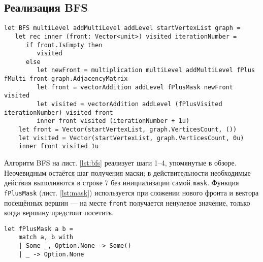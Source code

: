 \subsection{Реализация BFS}

\begin{lstlisting}[style=fsharp, caption={Функция, реализующая обход в ширину с применением матрично-векторных операций}, label={lst:bfs},  frame=single]
let BFS multiLevel addMultiLevel addLevel startVertexList graph =
   let rec inner (front: Vector<unit>) visited iterationNumber =
      if front.IsEmpty then
         visited
      else
         let newFront = multiplication multiLevel addMultiLevel fPlus fMulti front graph.AdjacencyMatrix
         let front = vectorAddition addLevel fPlusMask newFront visited
         let visited = vectorAddition addLevel (fPlusVisited iterationNumber) visited front
         inner front visited (iterationNumber + 1u)
    let front = Vector(startVertexList, graph.VerticesCount, ())
    let visited = Vector(startVertexList, graph.VerticesCount, 0u)
    inner front visited 1u
\end{lstlisting}

Алгоритм BFS на лист. \ref{lst:bfs} реализует шаги 1--4, упомянутые в обзоре. Неочевидным остаётся шаг получения маски; в действительности необходимые действия выполняются в строке 7 без инициализации самой \texttt{mask}. Функция \texttt{fPlusMask} (лист. \ref{lst:mask}) используется при сложении нового фронта и вектора посещённых вершин --- на месте \texttt{front} получается ненулевое значение, только когда вершину предстоит посетить. 



\begin{lstlisting}[style=fsharp, caption={Функция, имитирующая поведение маски для обновления вектора-фронта}, label={lst:mask},  frame=single]
let fPlusMask a b =
    match a, b with
    | Some _, Option.None -> Some()
    | _ -> Option.None
\end{lstlisting}


